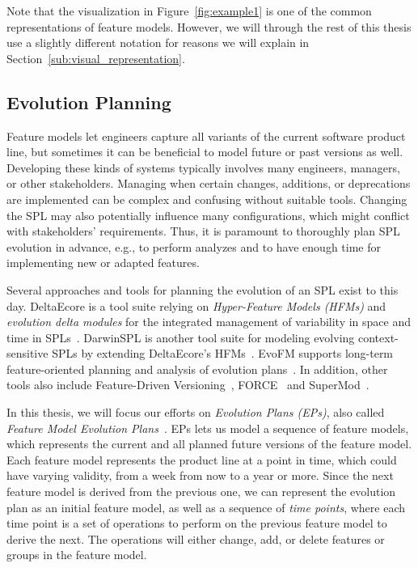 \documentclass[a4paper,english]{ifimaster}
\begin{document}
Note that the visualization in Figure~\vref{fig:example1} is one of the common representations of feature models. However, we will through the rest of this thesis use a slightly different notation for reasons we will explain in Section~\vref{sub:visual_representation}.

\subsection{Evolution Planning}%
\label{sub:evolution_planning}

Feature models let engineers capture all variants of the current software product line, but sometimes it can be beneficial to model future or past versions as well. Developing these kinds of systems typically involves many engineers, managers, or other stakeholders. Managing when certain changes, additions, or deprecations are implemented can be complex and confusing without suitable tools. Changing the SPL may also potentially influence many configurations, which might conflict with stakeholders' requirements. Thus, it is paramount to thoroughly plan SPL evolution in advance, e.g., to perform analyzes and to have enough time for implementing new or adapted features.

Several approaches and tools for planning the evolution of an SPL exist to this day. DeltaEcore is a tool suite relying on \textit{Hyper-Feature Models (HFMs)} and \textit{evolution delta modules} for the integrated management of variability in space and time in SPLs~\cite{cite:s02_deltaecore}. DarwinSPL is another tool suite for modeling evolving context-sensitive SPLs by extending DeltaEcore's HFMs~\cite{cite:s17_darwinspl}. EvoFM supports long-term feature-oriented planning and analysis of evolution plans~\cite{cite:evofm_fm_planning}. In addition, other tools also include Feature-Driven Versioning~\cite{cite:feature_driven_versioning}, FORCE~\cite{cite:force} and SuperMod~\cite{cite:supermod}.

In this thesis, we will focus our efforts on \textit{Evolution Plans (EPs)}, also called \textit{Feature Model Evolution Plans}~\cite{cite:consistency_preserving_evolution_planning}. EPs lets us model a sequence of feature models, which represents the current and all planned future versions of the feature model. Each feature model represents the product line at a point in time, which could have varying validity, from a week from now to a year or more. Since the next feature model is derived from the previous one, we can represent the evolution plan as an initial feature model, as well as a sequence of \textit{time points}, where each time point is a set of operations to perform on the previous feature model to derive the next. The operations will either change, add, or delete features or groups in the feature model.
\end{document}
